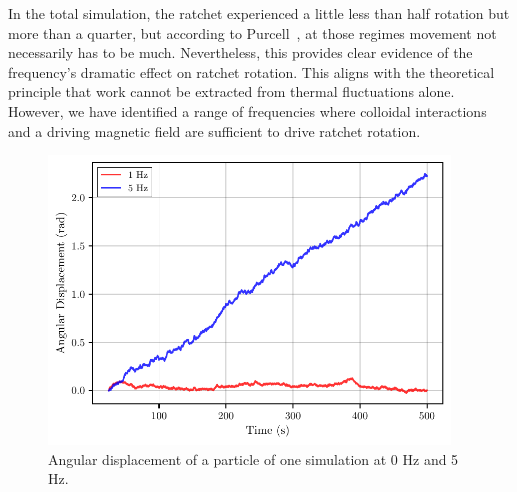 In the total simulation, the ratchet experienced a little less than half rotation but more than a quarter, but according to Purcell~\cite{purcell2014life}, at those regimes movement not necessarily has to be much. Nevertheless, this provides clear evidence of the frequency's dramatic effect on ratchet rotation. This aligns with the theoretical principle that work cannot be extracted from thermal fluctuations alone. However, we have identified a range of frequencies where colloidal interactions and a driving magnetic field are sufficient to drive ratchet rotation.


\begin{figure}
  \begin{center}
    \includegraphics[width=0.95\textwidth]{figures/particle_displacement.pdf}
  \end{center}
  \caption[Angular displacement of a particle.]{Angular displacement of a particle of one simulation at 0 Hz and 5 Hz.}\label{fig:particleangulardisplacement}
\end{figure}


